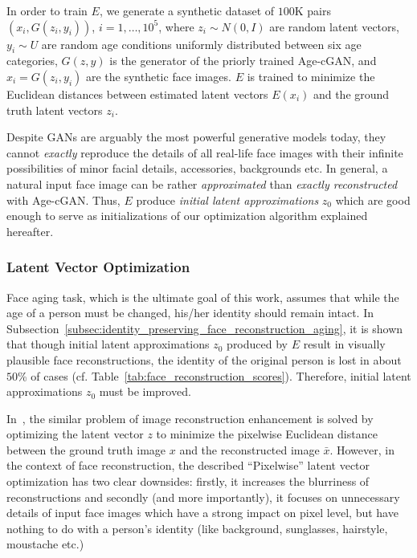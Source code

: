 \documentclass{article}
\begin{document}
In order to train $E$, we generate a synthetic dataset of $100$K pairs $(x_{i},G(z_{i},y_{i}))$, $i=1,\dots,10^{5}$, where $z_{i}\sim N(0,I)$ are random latent vectors, $y_{i}\sim U$ are random age conditions uniformly distributed between six age categories, $G(z,y)$ is the generator of the priorly trained Age-cGAN, and $x_{i}=G(z_{i},y_{i})$ are the synthetic face images.
$E$ is trained to minimize the Euclidean distances between estimated latent vectors $E(x_{i})$ and the ground truth latent vectors $z_{i}$.

Despite GANs are arguably the most powerful generative models today, they cannot \textit{exactly} reproduce the details of all real-life face images with their infinite possibilities of minor facial details, accessories, backgrounds etc.
In general, a natural input face image can be rather \textit{approximated} than \textit{exactly reconstructed} with Age-cGAN.
Thus, $E$ produce \textit{initial latent approximations} $z_{0}$ which are good enough to serve as initializations of our optimization algorithm explained hereafter.

\subsubsection{Latent Vector Optimization}

Face aging task, which is the ultimate goal of this work, assumes that while the age of a person must be changed, his/her identity should remain intact.
In Subsection~\ref{subsec:identity_preserving_face_reconstruction_aging}, it is shown that though initial latent approximations $z_{0}$ produced by $E$ result in visually plausible face reconstructions, the identity of the original person is lost in about $50$\% of cases (cf. Table~\ref{tab:face_reconstruction_scores}).
Therefore, initial latent approximations $z_{0}$ must be improved.

In~\cite{zhu2016generative}, the similar problem of image reconstruction enhancement is solved 
by optimizing the latent vector $z$ to minimize the pixelwise Euclidean distance between the ground truth image $x$ and the reconstructed image $\bar{x}$.
However, in the context of face reconstruction, the described ``Pixelwise'' latent vector optimization has two clear downsides: firstly, it increases the blurriness of reconstructions and secondly (and more importantly), it focuses on unnecessary details of input face images which have a strong impact on pixel level, but have nothing to do with a person's identity (like background, sunglasses, hairstyle, moustache etc.)
\end{document}

